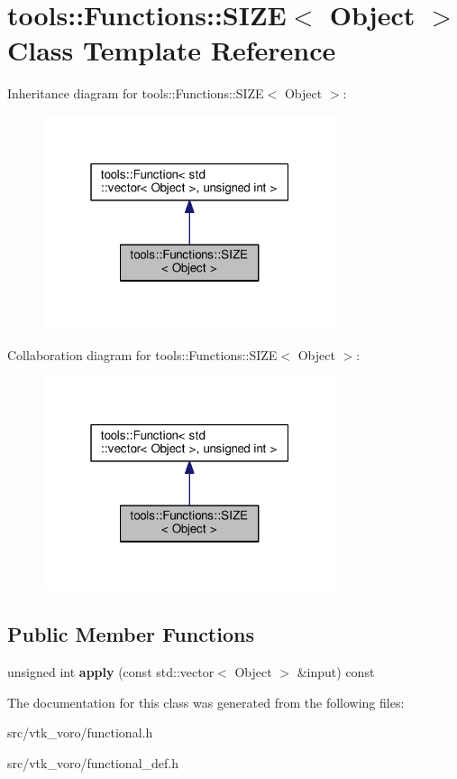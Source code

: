 \hypertarget{classtools_1_1Functions_1_1SIZE}{}\section{tools\+:\+:Functions\+:\+:S\+I\+ZE$<$ Object $>$ Class Template Reference}
\label{classtools_1_1Functions_1_1SIZE}


Inheritance diagram for tools\+:\+:Functions\+:\+:S\+I\+ZE$<$ Object $>$\+:
\nopagebreak
\begin{figure}[H]
\begin{center}
\leavevmode
\includegraphics[width=244pt]{classtools_1_1Functions_1_1SIZE__inherit__graph}
\end{center}
\end{figure}


Collaboration diagram for tools\+:\+:Functions\+:\+:S\+I\+ZE$<$ Object $>$\+:
\nopagebreak
\begin{figure}[H]
\begin{center}
\leavevmode
\includegraphics[width=244pt]{classtools_1_1Functions_1_1SIZE__coll__graph}
\end{center}
\end{figure}
\subsection*{Public Member Functions}
\begin{DoxyCompactItemize}
\item 
unsigned int {\bfseries apply} (const std\+::vector$<$ Object $>$ \&input) const \hypertarget{classtools_1_1Functions_1_1SIZE_a468dda3cbcdf9db9bc9841dc5f7c1ab6}{}\label{classtools_1_1Functions_1_1SIZE_a468dda3cbcdf9db9bc9841dc5f7c1ab6}

\end{DoxyCompactItemize}


The documentation for this class was generated from the following files\+:\begin{DoxyCompactItemize}
\item 
src/vtk\+\_\+voro/functional.\+h\item 
src/vtk\+\_\+voro/functional\+\_\+def.\+h\end{DoxyCompactItemize}
